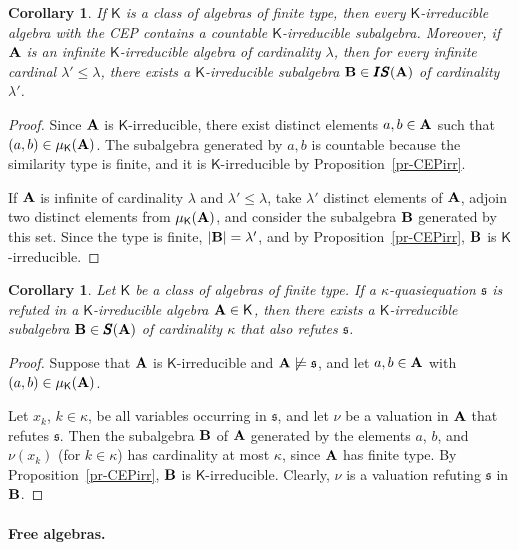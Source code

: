 \documentclass[submission,copyright,creativecommons]{eptcs}
\newtheorem{cor}[theorem]{Corollary}
\theoremstyle{definition}
\newcommand{\alg}[1]{{{\textbf{\upshape #1}}}}
\newcommand{\SU}{\pmb{S}}
\newcommand{\II}{\pmb{I}}
\newcommand{\vv}[1]{\mathsf {#1}}
\newcommand{\kk}{\kappa}
\newcommand{\lm}{\lambda}
\newcommand{\sq}{\mathfrak{s}}
\begin{document}
\begin{cor}\label{cor-CEPsubIrr}
	If $\vv K$ is a class of algebras of finite type, then every $\vv K$-irreducible algebra with the CEP contains a countable $\vv K$-irreducible subalgebra. Moreover, if $\alg A$ is an infinite $\vv K$-irreducible algebra of cardinality $\lm$, then for every infinite cardinal $\lm' \leq \lm$, there exists a $\vv K$-irreducible subalgebra $\alg B \in \II\SU(\alg A)$ of cardinality $\lm'$.
\end{cor}

\begin{proof}
	Since $\alg A$ is $\vv K$-irreducible, there exist distinct elements $a,b \in \alg A$ such that $(a,b) \in \mu_{\vv K}(\alg A)$. The subalgebra generated by ${a,b}$ is countable because the similarity type is finite, and it is $\vv K$-irreducible by Proposition~\ref{pr-CEPirr}.

	If $\alg A$ is infinite of cardinality $\lm$ and $\lm' \leq \lm$, take $\lm'$ distinct elements of $\alg A$, adjoin two distinct elements from $\mu_{\vv K}(\alg A)$, and consider the subalgebra $\alg B$ generated by this set. Since the type is finite, $|\alg B| = \lm'$, and by Proposition~\ref{pr-CEPirr}, $\alg B$ is $\vv K$-irreducible.
\end{proof}

\begin{cor}\label{cor-CEPref}
	Let $\vv K$ be a class of algebras of finite type. If a $\kk$-quasiequation $\sq$ is refuted in a $\vv K$-irreducible algebra $\alg A \in \vv K$, then there exists a $\vv K$-irreducible subalgebra $\alg B \in \SU(\alg A)$ of cardinality $\kk$ that also refutes $\sq$.
\end{cor}

\begin{proof}
	Suppose that $\alg A$ is $\vv K$-irreducible and $\alg A \not\models \sq$, and let $a,b \in \alg A$ with $(a,b) \in \mu_{\vv K}(\alg A)$.
	
	Let $x_k$, $k \in \kk$, be all variables occurring in $\sq$, and let $\nu$ be a valuation in $\alg A$ that refutes $\sq$. Then the subalgebra $\alg B$ of $\alg A$ generated by the elements $a$, $b$, and $\nu(x_k)$ (for $k \in \kk$) has cardinality at most $\kk$, since $\alg A$ has finite type. By Proposition~\ref{pr-CEPirr}, $\alg B$ is $\vv K$-irreducible. Clearly, $\nu$ is a valuation refuting $\sq$ in $\alg B$.
\end{proof}


\paragraph{Free algebras.}
\end{document}
